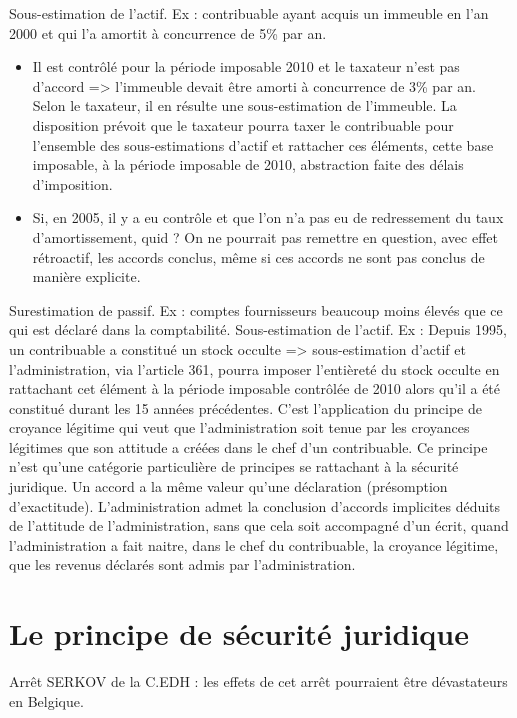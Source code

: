 \documentclass{book}
\begin{document}
Sous-estimation de l’actif. Ex : contribuable ayant acquis un immeuble en l’an 2000 et qui l’a amortit à concurrence de 5\% par an.
\begin{itemize} 
\item Il est contrôlé pour la période imposable 2010 et le taxateur n’est pas d’accord => l’immeuble devait être amorti à concurrence de 3\% par an. Selon le taxateur, il en résulte une sous-estimation de l’immeuble. La disposition prévoit que le taxateur pourra taxer le contribuable pour l’ensemble des sous-estimations d’actif et rattacher ces éléments, cette base imposable, à la période imposable de 2010, abstraction faite des délais d’imposition. 

\item Si, en 2005, il y a eu contrôle et que l’on n’a pas eu de redressement du taux d’amortissement, quid ? On ne pourrait pas remettre en question, avec effet rétroactif, les accords conclus, même si ces accords ne sont pas conclus de manière explicite. 
\end{itemize}


Surestimation de passif. Ex : comptes fournisseurs beaucoup moins élevés que ce qui est déclaré dans la comptabilité. 
Sous-estimation de l’actif. Ex : Depuis 1995, un contribuable a constitué un stock occulte => sous-estimation d’actif et l’administration, via l’article 361, pourra imposer l’entièreté du stock occulte en rattachant cet élément à la période imposable contrôlée de 2010 alors qu’il a été constitué durant les 15 années précédentes.
C’est l’application du principe de croyance légitime qui veut que l’administration soit tenue par les croyances légitimes que son attitude a créées dans le chef d’un contribuable. Ce principe n’est qu’une catégorie particulière de principes se rattachant à la sécurité juridique. 
Un accord a la même valeur qu’une déclaration (présomption d’exactitude). 
L’administration admet la conclusion d’accords implicites déduits de l’attitude de l’administration, sans que cela soit accompagné d’un écrit, quand l’administration a fait naitre, dans le chef du contribuable, la croyance légitime, que les revenus déclarés sont admis par l’administration. 

\section{Le principe de sécurité juridique}

Arrêt SERKOV de la C.EDH : les effets de cet arrêt pourraient être dévastateurs en Belgique. 
\end{document}
